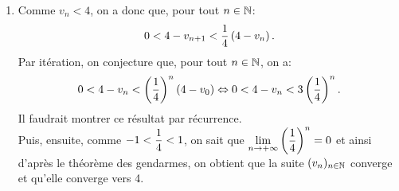 \documentclass[a4paper, 11pt,reqno]{article}
\begin{document}
\begin{correction}
\begin{enumerate}
\begin{itemize}
			      \item[$\bullet$] La fonction $f$ est continue sur $\lbrack v_n,4\rbrack$ (ici on sait que $v_n<4$)
			      \item[$\bullet$]  La fonction $f$ est d\'erivable sur $\rbrack v_n,4\lbrack$.
		      \end{itemize}
		      Ainsi, d'apr\`es le th\'eor\`eme des accroissements finis, on sait qu'il existe $c\in\rbrack v_n,4\lbrack$ tel que
		      $$f(4)-f(v_n)=(4-v_n)f^{\prime}(c)\Leftrightarrow 4-v_{n+1}=(4-v_n)f^{\prime}(c).$$
		      Il reste alors \`a majorer la d\'eriv\'ee $f^{\prime}(c)$. Or, on a: $f^{\prime}(c)=\ddp\frac{1}{2\sqrt{12+c}}$. Or on sait que $c>v_n>0$ donc $12+c>12$ et ainsi: $\ddp\frac{1}{2\sqrt{12+c}}<\ddp\frac{1}{2\sqrt{12}}$. Or: $2\sqrt{12}=4\sqrt{3}>4$ et ainsi, on obtient que: $\ddp\frac{1}{2\sqrt{12+c}}<\ddp\frac{1}{2\sqrt{12}}<\ddp\frac{1}{4}$. Puis, comme $4-v_n>0$, on a bien que
		      $$4-v_{n+1}<\ddp\frac{1}{4}\left( 4-v_n\right).$$
		\item  Comme $v_n<4$, on a donc que, pour tout $n\in\mathbb{N}$:
		      $$0<4-v_{n+1}<\displaystyle\frac{1}{4}\left( 4-v_n\right).$$
		      Par it\'eration, on conjecture que, pour tout $n\in\mathbb{N}$, on a:
		      $$0<4-v_n<\left( \displaystyle\frac{1}{4} \right)^n \left( 4-v_0\right)\Leftrightarrow 0<4-v_n<3\left( \displaystyle\frac{1}{4} \right)^n .$$
		      Il faudrait montrer ce r\'esultat par r\'ecurrence.\\
		      \noindent Puis, ensuite, comme $-1<\displaystyle\frac{1}{4}<1$, on sait que $\lim\limits_{n\to +\infty} \left( \displaystyle\frac{1}{4} \right)^n=0$ et ainsi d'apr\`es le th\'eor\`eme des gendarmes, on obtient que la suite $(v_n)_{n\in \mathbb{N}}$ converge et qu'elle converge vers 4.
	\end{enumerate}
\end{correction}
\end{document}
